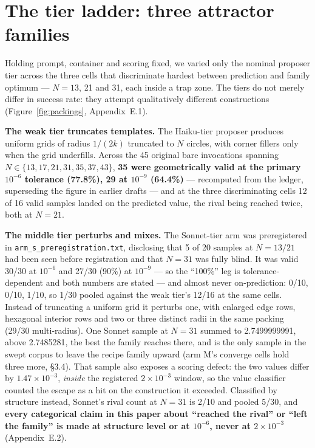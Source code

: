 \section{The tier ladder: three attractor families}

Holding prompt, container and scoring fixed, we varied only the nominal proposer tier across the
three cells that discriminate hardest between prediction and family optimum --- $N = 13$, 21 and
31, each inside a trap zone. The tiers do not merely differ in success rate: they attempt
qualitatively different constructions (Figure~\ref{fig:packings}, Appendix~E.1).

\textbf{The weak tier truncates templates.} The Haiku-tier proposer produces uniform grids of
radius $1/(2k)$ truncated to $N$ circles, with corner fillers only when the grid underfills. Across
the 45 original bare invocations spanning $N \in \{13, 17, 21, 31, 35, 37, 43\}$, \textbf{35 were
geometrically valid at the primary $10^{-6}$ tolerance (77.8\%), 29 at $10^{-9}$ (64.4\%)} ---
recomputed from the ledger, superseding the figure in earlier drafts --- and at the three
discriminating cells 12 of 16 valid samples landed on the predicted value, the rival being reached
twice, both at $N = 21$.

\textbf{The middle tier perturbs and mixes.} The Sonnet-tier arm was preregistered in
\texttt{arm\_s\_preregistration.txt}, disclosing that 5 of 20 samples at $N = 13/21$ had been seen
before registration and that $N = 31$ was fully blind. It was valid 30/30 at $10^{-6}$ and 27/30
(90\%) at $10^{-9}$ --- so the ``100\%'' leg is tolerance-dependent and both numbers are stated ---
and almost never on-prediction: 0/10, 0/10, 1/10, so 1/30 pooled against the weak tier's 12/16 at
the same cells. Instead of truncating a uniform grid it perturbs one, with enlarged edge rows,
hexagonal interior rows and two or three distinct radii in the same packing (29/30 multi-radius).
One Sonnet sample at $N = 31$ summed to 2.7499999991, above 2.7485281, the best the family reaches
there, and is the only sample in the swept corpus to leave the recipe family upward (arm M's
converge cells hold three more, \S3.4). That sample also exposes a scoring defect: the two values
differ by $1.47\times10^{-3}$, \emph{inside} the registered $2\times10^{-3}$ window, so the value
classifier counted the escape as a hit on the construction it exceeded. Classified by structure
instead, Sonnet's rival count at $N = 31$ is 2/10 and pooled 5/30, and \textbf{every categorical
claim in this paper about ``reached the rival'' or ``left the family'' is made at structure level
or at $10^{-6}$, never at $2\times10^{-3}$} (Appendix~E.2).

